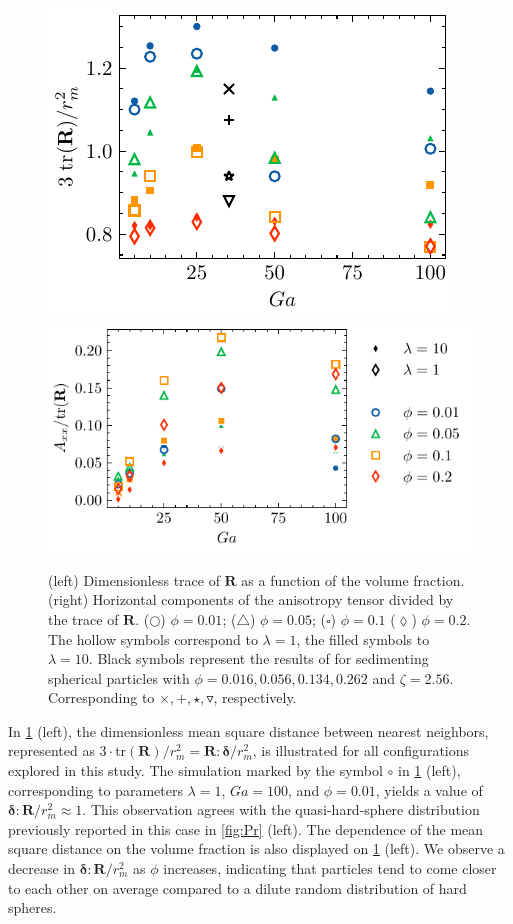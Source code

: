 \documentclass[11pt]{My_preprint}
\begin{document}
\begin{figure}[h!]
    \centering
    \includegraphics[height=0.3\textwidth]{image/HOMOGENEOUS_NEW/PA/trR.pdf}
    \includegraphics[height=0.3\textwidth]{image/HOMOGENEOUS_NEW/PA/Axx.pdf}
    \caption{
        (left) Dimensionless trace of $\textbf{R}$ as a function of the volume fraction.(right) Horizontal components of the anisotropy tensor divided by the trace of $\textbf{R}$. ($\pmb\bigcirc$) $\phi = 0.01$; ($\pmb\triangle$) $ \phi = 0.05$; ($\pmb\square$) $\phi = 0.1$ ($\pmb\lozenge$) $\phi = 0.2$.
    The hollow symbols correspond to $\lambda = 1$, the filled symbols to $\lambda = 10$.
Black symbols represent the results of \citet{zhang2023evolution} for sedimenting spherical particles with $\phi = 0.016,0.056,0.134,0.262$ and $\zeta = 2.56$. Corresponding to $\pmb\times,\pmb +, \pmb\star , \pmb\triangledown$, respectively.
    }
    \label{fig:A}
\end{figure}
In \ref{fig:A} (left), the dimensionless mean square distance between nearest neighbors, represented as $3\cdot\text{tr}(\textbf{R})/r_m^2 = \textbf{R}:\bm\delta/r_m^2$, is illustrated for all configurations explored in this study. 
The simulation marked by the symbol \textcolor{col1}{$\pmb\circ$} in \ref{fig:A} (left), corresponding to parameters $\lambda = 1$, $Ga = 100$, and $\phi = 0.01$, yields a value of $\bm\delta:\textbf{R}/r_m^2 \approx 1$. 
This observation agrees with the quasi-hard-sphere distribution previously reported in this case in \ref{fig:Pr} (left).
The dependence of the mean square distance on the volume fraction is also displayed on \ref{fig:A} (left). 
We observe a decrease in $\bm\delta:\textbf{R}/r_m^2$ as $\phi$ increases, indicating that particles tend to come closer to each other on average compared to a dilute random distribution of hard spheres. 
\end{document}
